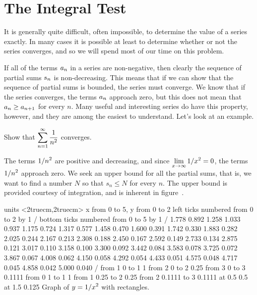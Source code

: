 \section{The Integral Test}{}{}
\nobreak
It is generally quite difficult, often impossible, to determine
the value of a series exactly. In many cases it is possible at least
to determine whether or not the series converges, and so we will spend
most of our time on this problem.

If all of the terms $\displaystyle a_n$ in a series are non-negative, then clearly 
the sequence of partial sums $\displaystyle s_n$ is non-decreasing. This means that
if we can show that the sequence of partial sums is bounded, the
series must converge. We know that if the series converges, the terms
$\displaystyle a_n$ approach zero, but this does not mean that $\displaystyle a_n\ge a_{n+1}$ for
every $n$. Many useful and interesting series do have this property,
however, and they are among the easiest to understand. Let's look at
an example.

\example Show that $\displaystyle\sum_{n=1}^\infty {1\over n^2}$ converges.
\par\nobreak\ssk\noindent
The terms $\displaystyle 1/n^2$ are  positive and decreasing, and since 
$\displaystyle\lim_{x\to\infty} 1/x^2=0$, the terms $\displaystyle 1/n^2$ approach zero. We
seek an upper bound for all the partial sums, that is, we want to find
a number $N$ so that $s_n\le N$ for every $n$. The upper bound is
provided courtesy of integration, and is inherent in
figure~.

\figure
\texonly
\vbox{\beginpicture
\normalgraphs
\ninepoint
\setcoordinatesystem units <2truecm,2truecm>
\setplotarea x from 0 to 5, y from 0 to 2
\axis left ticks numbered from 0 to 2 by 1 /
\axis bottom  ticks numbered from 0 to 5 by 1 /
\setquadratic
{} 1.778 0.892 1.258 1.033 0.937 1.175 0.724 1.317 0.577 
1.458 0.470 1.600 0.391 1.742 0.330 1.883 0.282 2.025 0.244 
2.167 0.213 2.308 0.188 2.450 0.167 2.592 0.149 2.733 0.134 
2.875 0.121 3.017 0.110 3.158 0.100 3.300 0.092 3.442 0.084 
3.583 0.078 3.725 0.072 3.867 0.067 4.008 0.062 4.150 0.058 
4.292 0.054 4.433 0.051 4.575 0.048 4.717 0.045 4.858 0.042 
5.000 0.040 /
\putrule from 1 0 to 1 1 
\putrule from 2 0 to 2 0.25
\putrule from 3 0 to 3 0.1111
\putrule from 0 1 to 1 1 
\putrule from 1 0.25 to 2 0.25
\putrule from 2 0.1111 to 3 0.1111
\sevenpoint
{} at 0.5 0.5
 at 1.5 0.125
\endpicture}
\endtexonly
{}
\begincaption
Graph of $\displaystyle y=1/x^2$ with rectangles.
\endcaption
\endfigure

